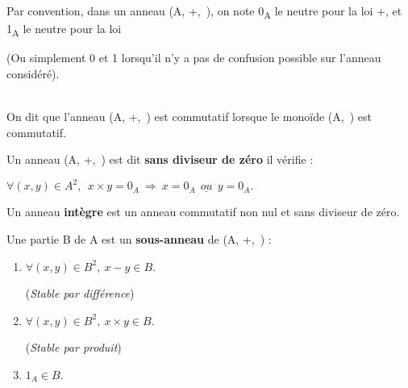 \vspace{0.2cm}

\noindent Par convention, dans un anneau (A, +,\ \x), on note 0\textsubscript{A} le neutre pour la loi +, et 1\textsubscript{A} le neutre pour la loi \x
\begin{small}
    (Ou simplement 0 et 1 lorsqu'il n'y a pas de confusion possible sur l'anneau considéré).
\end{small} \\
On dit que l'anneau (A, +,\ \x) est commutatif lorsque le monoïde (A,\ \x) est commutatif.

\vspace{1cm}

\noindent Un anneau (A, +,\ \x) est dit \textbf{sans diviseur de zéro} \ssi il vérifie : \vspace{-0.2cm}
\begin{center}
    \( \forall(x,y)\in A^2,\ \ x\times y=0_A \ \Rightarrow \ x=0_A\ \ \underline{ou}\ \ y=0_A. \)
\end{center}\vspace{0.2cm}
Un anneau \textbf{intègre} est un anneau commutatif non nul et sans diviseur de zéro.

\vspace{1.2cm}

\noindent Une partie B de A est un \textbf{sous-anneau} de (A, +,\ \x) \ssi :\vspace{-0.1cm}
\begin{enumerate}[leftmargin=2cm]
    \item \(\forall(x,y)\in B^2,\ x-y\in B \). \
    \begin{small}
        (\emph{Stable par différence})
    \end{small}\vspace{0.1cm}

    \item \(\forall(x,y)\in B^2,\ x\times y\in B \). \
    \begin{small}
        (\emph{Stable par produit})
    \end{small}\vspace{0.1cm}

    \item \(1_A\in B.\)
\end{enumerate}
\vspace{1cm}

